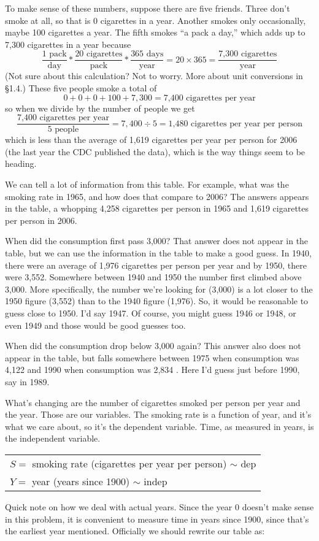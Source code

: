 To make sense of these numbers, suppose there are five friends.  Three don't smoke at all, so that is 0 cigarettes in a year.  Another smokes only occasionally, maybe 100 cigarettes a year.  The fifth smokes ``a pack a day,''  which adds up to 7,300 cigarettes in a year because
$$\frac{1\text{ pack}}{\text{day}} \ast \frac{20\text{ cigarettes}}{\text{pack}} 
\ast \frac{365 \text{ days}}{\text{year}} 
=20 \times 365
= \frac{\text{7,300 cigarettes}}{\text{year}} $$
(Not sure about this calculation?  Not to worry.  More about unit conversions in \S1.4.) %
These five people smoke a total of $$0+0+0+100+7,300=\text{7,400 cigarettes per year}$$
so when we divide by the number of people we get
$$\frac{\text{7,400 cigarettes per year}}{5 \text{ people}} = 7,400 \div 5 = \text{1,480 cigarettes per year per person}$$
which is less than the average of 1,619 cigarettes per year per person for 2006 (the last year the CDC published the data), which is the way things seem to be heading. 

We can tell a lot of information from this table.  For example, what was the smoking rate in 1965, and how does that compare to 2006?  The answers appears in the table, a whopping 4,258 cigarettes per person in 1965 and 1,619 cigarettes per person in 2006.

When did the consumption first pass 3,000?  That answer does not appear in the table, but we can use the information in the table to make a good guess.  In 1940, there were an average of 1,976 cigarettes per person per year and by 1950, there were 3,552.  Somewhere between 1940 and 1950 the number first climbed above 3,000.  More specifically, the number we're looking for (3,000) is a lot closer to the 1950 figure (3,552) than to the 1940 figure (1,976).  So, it would be reasonable to guess close to 1950.  I'd say 1947.  Of course, you might guess 1946 or 1948, or even 1949 and those would be good guesses too.  

When did the consumption drop below 3,000 again?  This answer also does not appear in the table, but falls somewhere between 1975 when consumption was 4,122 and 1990 when consumption was  2,834 .  Here I'd guess just before 1990, say in 1989.   

What's changing are the number of cigarettes smoked per person per year and the year.  Those are our variables.  The smoking rate is a function of year, and it's what we care about, so it's the dependent variable.  Time, as measured in years, is the independent variable.   
\begin{center}
\begin{tabular} {l}
$S=$ smoking rate (cigarettes per year per person) $\sim$ dep \\
$Y= $ year (years since 1900) $\sim$ indep \\ 
\end{tabular}
\end{center}
Quick note on how we deal with actual years.  Since the year 0 doesn't make sense in this problem, it is convenient to measure time in years since 1900, since that's the earliest year mentioned. Officially we should rewrite our table as:

